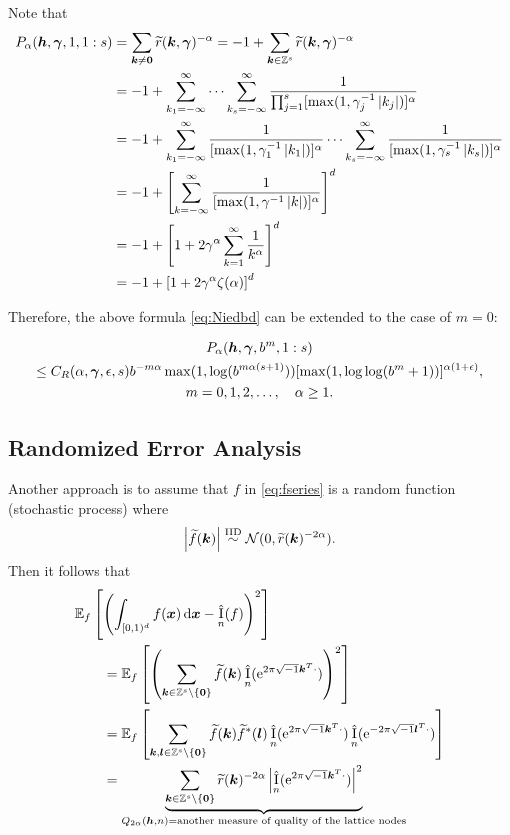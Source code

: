 \documentclass{amsart}
\newcommand{\tr}{\widetilde{r}}
\newcommand{\appxintn}{\appxint_n}
\DeclareMathOperator{\appxint}{\hat{I}}
\begin{document}
Note that
\begin{align*}
    P_{\alpha}(\vh,\vgamma,1,1:s) & = \sum_{\vk \ne \vzero} \tr(\vk, \vgamma)^{-\alpha} = -1 + \sum_{\vk \in \integers^s} \tr(\vk,\vgamma)^{-\alpha} \\
    & = -1 + \sum_{k_1 =-\infty}^{\infty} \cdots \sum_{k_s  =-\infty}^{\infty} \frac{1}{\prod_{j=1}^s[\max(1,\gamma_j^{-1}\abs{k_j})]^\alpha} \\
    & = -1 + \sum_{k_1 =-\infty}^{\infty} \frac{1}{[\max(1,\gamma_1^{-1}\abs{k_1})]^\alpha} \cdots \sum_{k_s  =-\infty}^{\infty} \frac{1}{[\max(1,\gamma_s^{-1}\abs{k_s})]^\alpha} \\
    & = -1 + \left[\sum_{k =-\infty}^{\infty} \frac{1}{[\max(1,\gamma^{-1}\abs{k})]^\alpha} \right]^d \\
    & = -1 + \left[1 + 2 \gamma^{\alpha} \sum_{k =1}^{\infty} \frac{1}{k^\alpha} \right]^d \\
    & = -1 + \left[1 + 2 \gamma^{\alpha}\zeta(\alpha) \right]^d
\end{align*}

Therefore, the above formula \eqref{eq:Niedbd} can be extended to the case of $m=0$:

\begin{multline} \label{eq:Palphaextm}
    P_{\alpha}(\boldsymbol{h},\boldsymbol{\gamma},b^m,1:s) \\
    \le C_{R}(\alpha,\boldsymbol{\gamma},\epsilon,s)
    b^{-m\alpha}\max(1, \log(b^{m\alpha(s+1)})) [\max(1,\log \log (
    b^m+1))]^{\alpha(1+\epsilon)}, \\ m =0, 1, 2,\ldots, \quad \alpha \ge 1.
\end{multline}


\subsection{Randomized Error Analysis}
Another approach is to assume that $f$ in \eqref{eq:fseries} is a random function (stochastic process) where
\begin{equation}
    \abs{\tf(\vk)} \IIDsim \cn(0,\tr(\vk)^{-2\alpha}).
\end{equation}
Then it follows that
\begin{align*}
    \MoveEqLeft{\Ex_f\left[\left(\int_{[0,1)^d} f(\vx) \, \dif \vx - \appxintn(f) \right)^2\right]} \\
    & =
    \Ex_f\left[\left(\sum_{\vk \in \integers^s \setminus\{\vzero\}} \tf(\vk) \appxintn(\me^{2 \pi \sqrt{-1} \vk^T \cdot})\right)^2\right] \\
     & =
    \Ex_f\left[\sum_{\vk,\vl \in \integers^s \setminus\{\vzero\}} \tf(\vk) \tf^*(\vl) \appxintn(\me^{2 \pi \sqrt{-1} \vk^T \cdot}) \appxintn(\me^{-2 \pi \sqrt{-1} \vl^T \cdot})\right] \\
    & = \underbrace{\sum_{\vk\in \integers^s \setminus\{\vzero\}} \tr(\vk)^{-2\alpha} \abs{\appxintn(\me^{2 \pi \sqrt{-1} \vk^T \cdot})}^2}_{Q_{2\alpha}(\vh,n) = \text{another measure of quality of the lattice nodes}}  \\
\end{align*}
\end{document}
